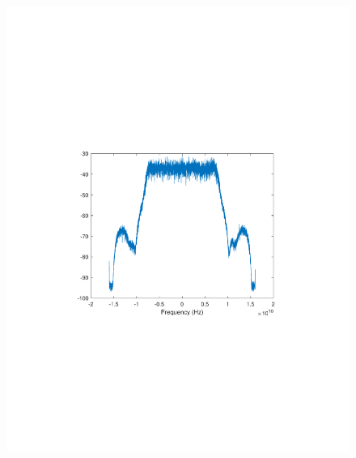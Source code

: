 \begin{refsection}
\begin{figure}[H]
	\centering
	\begin{minipage}{0.30\textwidth}
		\centering
		\includegraphics[clip, trim=4cm 8cm 4cm 8cm, width=1\textwidth]{./sdf/m_qam_system/figures/expResults/homodyne/3_16GBdInSig13dB_AfMIMO1.pdf}
		\label{fig:16GBdEyeMIMO1}
	\end{minipage}
	\begin{minipage}{0.30\textwidth}
		\centering

\end{minipage}
\end{figure}
\end{refsection}
